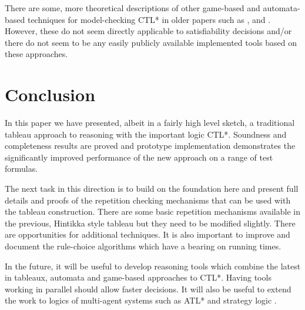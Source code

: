 \documentclass[submission,copyright,creativecommons]{eptcs}
\begin{document}
There are some, more theoretical descriptions of 
other game-based and automata-based
techniques for model-checking CTL*
in older papers such as
\cite{Lange00modelchecking},
\cite{DBLP:conf/cav/BernholtzVW94}
and
\cite{DBLP:conf/focs/KupfermanV05}.
However, these do not seem 
directly applicable to satisfiability decisions
and/or there do not seem to be any easily publicly available
implemented tools based on these
approaches.


\section{Conclusion}
\label{sec:concl}

In this paper we have presented, albeit in a fairly high level sketch, a traditional tableau
approach to reasoning with the important logic CTL*.
Soundness and completeness results are proved
and prototype implementation
demonstrates the significantly improved performance of the new approach on
a range of test formulas.

The next task in this direction is
to build on the foundation here and
present full details and proofs of the
repetition checking mechanisms that
can be used with the tableau construction.
There are some basic repetition mechanisms available in the previous, Hintikka style 
tableau
\cite{Rey:startab} but they need to be modified slightly. 
There are opportunities for additional techniques.
It is also important to
improve and document the
rule-choice algorithms which
have a bearing on
running times.


In the future, 
it will be useful to develop reasoning tools which combine
the latest 
in tableaux, automata and game-based
approaches to CTL*.
Having tools working in parallel should allow faster decisions.
It will also be useful to extend the work to 
logics of multi-agent systems such as ATL* 
and strategy logic \cite{DBLP:conf/concur/MogaveroMPV12}.
\end{document}
